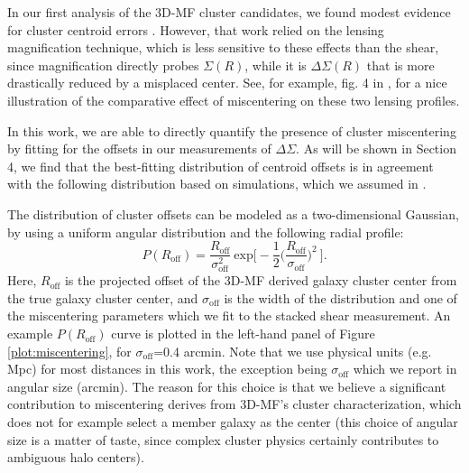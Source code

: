 In our first analysis of the \ac{3D-MF} cluster candidates, we found modest evidence for cluster centroid errors \citep{Ford14}. However, that work relied on the lensing magnification technique, which is less sensitive to these effects than the shear, since magnification directly probes $\Sigma(R)$, while it is $\Delta\Sigma(R)$ that is more drastically reduced by a misplaced center. See, for example, fig. 4 in \citet{Johnston07}, for a nice illustration of the comparative effect of miscentering on these two lensing profiles. 

In this work, we are able to directly quantify the presence of cluster miscentering by fitting for the offsets in our measurements of $\Delta\Sigma$. As will be shown in Section 4, we find that the best-fitting distribution of centroid offsets is in agreement with the following distribution based on simulations, which we assumed in \citet{Ford14}. 

The distribution of cluster offsets can be modeled as a two-dimensional Gaussian, by using a uniform angular distribution and the following radial profile:
\begin{equation}
P(R_{\mathrm{off}})=\frac{R_{\mathrm{off}}}{\sigma_{\mathrm{off}}^2}\ \mathrm{exp}\bigg[-\frac{1}{2}\bigg(\frac{R_{\mathrm{off}}}{\sigma_{\mathrm{off}}}\bigg)^2\ \bigg].
\end{equation}
Here, $R_{\mathrm{off}}$ is the projected offset of the \ac{3D-MF} derived galaxy cluster center from the true galaxy cluster center, and $\sigma_{\mathrm{off}}$ is the width of the distribution and one of the miscentering parameters which we fit to the stacked shear measurement. An example $P(R_{\mathrm{off}})$ curve is plotted in the left-hand panel of Figure \ref{plot:miscentering}, for $\sigma_{\mathrm{off}}$=0.4 arcmin. Note that we use physical units (e.g. Mpc) for most distances in this work, the exception being $\sigma_{\mathrm{off}}$ which we report in angular size (arcmin). The reason for this choice is that we believe a significant contribution to miscentering derives from \ac{3D-MF}'s cluster characterization, which does not for example select a member galaxy as the center (this choice of angular size is a matter of taste, since complex cluster physics certainly contributes to ambiguous halo centers). 

